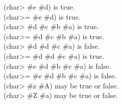 \begin{defun}[Function]
\begin{lisp}
(char> \#{\Xbackslash}e \#{\Xbackslash}d) \textrm{is true.} \\
(char>= \#{\Xbackslash}e \#{\Xbackslash}d) \textrm{is true.} \\
(char> \#{\Xbackslash}d \#{\Xbackslash}c \#{\Xbackslash}b \#{\Xbackslash}a) \textrm{is true.} \\
(char>= \#{\Xbackslash}d \#{\Xbackslash}c \#{\Xbackslash}b \#{\Xbackslash}a) \textrm{is true.} \\
(char> \#{\Xbackslash}d \#{\Xbackslash}d \#{\Xbackslash}c \#{\Xbackslash}a) \textrm{is false.} \\
(char>= \#{\Xbackslash}d \#{\Xbackslash}d \#{\Xbackslash}c \#{\Xbackslash}a) \textrm{is true.} \\
(char> \#{\Xbackslash}e \#{\Xbackslash}d \#{\Xbackslash}b \#{\Xbackslash}c \#{\Xbackslash}a) \textrm{is false.} \\
(char>= \#{\Xbackslash}e \#{\Xbackslash}d \#{\Xbackslash}b \#{\Xbackslash}c \#{\Xbackslash}a) \textrm{is false.} \\
(char> \#{\Xbackslash}z \#{\Xbackslash}A) \textrm{may be true or false.} \\
(char> \#{\Xbackslash}Z \#{\Xbackslash}a) \textrm{may be true or false.}
\end{lisp}


\end{defun}
